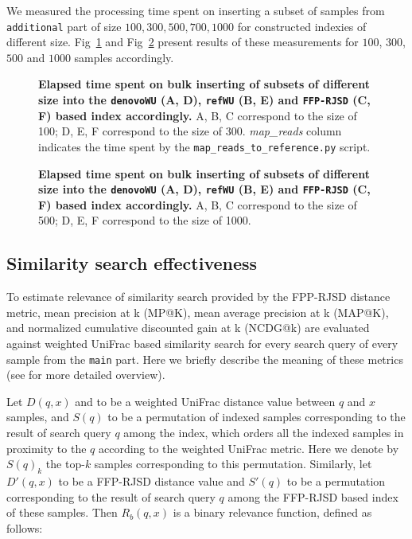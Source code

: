 \documentclass[10pt,letterpaper]{article}
\begin{document}
We measured the processing time spent on inserting a subset of samples from \texttt{additional} part of size
$100, 300, 500, 700, 1000$ for constructed indexies of different size. Fig~\ref{fig3} and Fig~\ref{fig4} present results of
these measurements for $100$, $300$, $500$ and $1000$ samples accordingly. 


\begin{figure}[!h]
\caption{{\bf Elapsed time spent on bulk inserting of subsets of different size into the \texttt{denovoWU} (A, D), \texttt{refWU} (B, E) and \texttt{FFP-RJSD} (C, F) based index accordingly.}
A, B, C correspond to the size of 100; D, E, F correspond to the size of 300. \textit{map\_reads} column indicates the time
spent by the \texttt{map\_reads\_to\_reference.py} script. }
\label{fig3}
\end{figure}


\begin{figure}[!h]
\caption{{\bf Elapsed time spent on bulk inserting of subsets of different size into the \texttt{denovoWU} (A, D), \texttt{refWU} (B, E) and \texttt{FFP-RJSD} (C, F) based index accordingly.}
A, B, C correspond to the size of 500; D, E, F correspond to the size of 1000.}
\label{fig4}
\end{figure}

\subsection*{Similarity search effectiveness}
To estimate relevance of similarity search provided by the FPP-RJSD distance metric, mean precision at k (MP@K), mean average precision at k (MAP@K), 
and normalized cumulative discounted gain at k (NCDG@k) \cite{informationretrieval2008, jarvelin2000ir, jarvelin2002cumulated}
are evaluated against weighted UniFrac based similarity search for every search query of every sample from the \texttt{main} part. 
Here we briefly describe the meaning of these metrics (see \cite{informationretrieval2008} for more detailed overview).


Let $D(q, x)$ and to be a weighted UniFrac distance value between $q$ and $x$ samples, 
and $S(q)$ to be a permutation of indexed samples corresponding to the result of search query $q$ among the index, 
which orders all the indexed samples in proximity to the $q$ according to the weighted UniFrac metric. 
Here we denote by $S(q)_k$ the top-$k$ samples corresponding to this permutation.
Similarly, let $D'(q, x)$ to be a FFP-RJSD distance value and $S'(q)$ to be a permutation corresponding to the 
result of search query $q$ among the FFP-RJSD based index of these samples. 
Then $R_b(q, x)$ is a binary relevance function, defined as follows:
\end{document}
